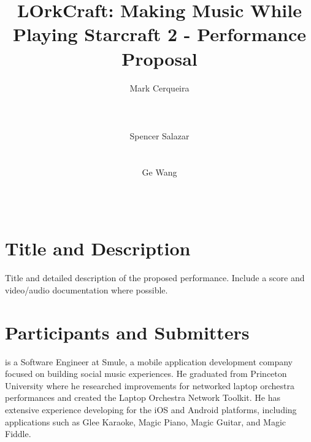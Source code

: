 \documentclass{nime-document-singlecolumn-class}
\begin{document}

\newcommand{\projectName}{LOrkCraft}

\title{\projectName{}: Making Music While Playing Starcraft 2 - Performance Proposal}

\author{
\alignauthor
Mark Cerqueira\\
       \\
       \\
       \\
\alignauthor
Spencer Salazar\\
       \\
       \\
\alignauthor
Ge Wang\\
       \\
       \\
}

\maketitle


\section{Title and Description}
Title and detailed description of the proposed performance. Include a score and video/audio documentation where possible.

\section{Participants and Submitters}
 is a Software Engineer at Smule, a mobile application development company focused on building social music experiences.
He graduated from Princeton University where he researched improvements for networked laptop orchestra performances and created the Laptop Orchestra Network Toolkit.
He has extensive experience developing for the iOS and Android platforms, including applications such as Glee Karaoke, Magic Piano, Magic Guitar, and Magic Fiddle.
\end{document}
